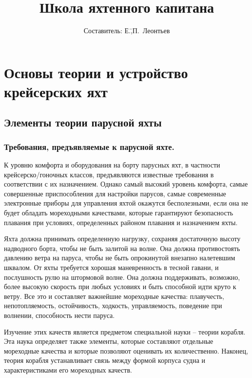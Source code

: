 \documentclass[a4paper, 12pt, twoside, final, book, russian, fittopage, cyremdash]{ncc}
\begin{document}
\frontmatter

\author{\LARGE Составитель: Е.\=,П.~Леонтьев}
\title{Школа яхтенного капитана}
\titlefoot{\theyear}
\maketitle

\tableofcontents
\listoffigures
\listoftables

\mainmatter

\chapter{Основы теории и устройство крейсерских яхт}

\section{Элементы теории парусной яхты}

\subsection{Требования, предъявляемые к парусной яхте.}

К уровню комфорта и оборудования на борту парусных яхт, в частности крейсерско\-/гоночных классов, предъявляются известные требования в соответствии с их назначением. Однако самый высокий уровень комфорта, самые совершенные приспособления для настройки парусов, самые современные электронные приборы для управления яхтой окажутся бесполезными, если она не будет обладать мореходными качествами, которые гарантируют безопасность плавания при условиях, определенных районом плавания и назначением яхты.

Яхта должна принимать определенную нагрузку, сохраняя достаточную высоту надводного борта, чтобы не быть залитой на волне. Она должна противостоять давлению ветра на паруса, чтобы не быть опрокинутой внезапно налетевшим шквалом. От яхты требуется хорошая маневренность в тесной гавани, и послушность рулю на штормовой волне. Она должна поддерживать, возможно, более высокую скорость при любых условиях и быть способной идти круто к ветру. Все это и составляет важнейшие мореходные качества: плавучесть, непотопляемость, остойчивость, ходкость, управляемость, поведение при волнении, способность нести паруса.

Изучение этих качеств является предметом специальной науки \--- теории корабля. Эта наука определяет также элементы, которые составляют отдельные мореходные качества и которые позволяют оценивать их количественно. Наконец, теория корабля устанавливает связь между формой корпуса судна и характеристиками его мореходных качеств.
\end{document}
